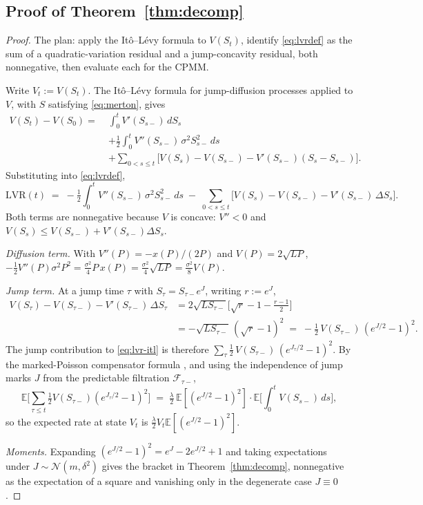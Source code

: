 \documentclass[runningheads]{llncs}
\newcommand{\E}{\mathbb{E}}
\newcommand{\1}{\mathbf{1}}
\begin{document}
\subsection{Proof of Theorem~\ref{thm:decomp}}\label{app:decomp}

\begin{proof}
The plan: apply the It\^o--L\'evy formula to $V(S_t)$, identify \eqref{eq:lvrdef} as the sum of a quadratic-variation residual and a jump-concavity residual, both nonnegative, then evaluate each for the CPMM.

Write $V_t := V(S_t)$. The It\^o--L\'evy formula for jump-diffusion processes \cite[Prop.~8.14]{cont2003financial} applied to $V$, with $S$ satisfying \eqref{eq:merton}, gives
\begin{align*}
V(S_t) - V(S_0) =\;& \int_0^t V'(S_{s-})\,dS_s \\
&+ \tfrac{1}{2}\int_0^t V''(S_{s-})\,\sigma^2 S_{s-}^2 \,ds \\
&+ \sum_{0 < s \leq t} \!\Big[V(S_s) - V(S_{s-}) - V'(S_{s-})(S_s - S_{s-})\Big].
\end{align*}
Substituting into \eqref{eq:lvrdef},
\begin{equation}\label{eq:lvr-itl}
\mathrm{LVR}(t) \;=\; -\tfrac{1}{2}\int_0^t V''(S_{s-})\,\sigma^2 S_{s-}^2 \, ds \;-\; \sum_{0 < s \leq t}\!\Big[V(S_s) - V(S_{s-}) - V'(S_{s-})\,\Delta S_s\Big].
\end{equation}
Both terms are nonnegative because $V$ is concave: $V''<0$ and $V(S_s) \leq V(S_{s-}) + V'(S_{s-})\Delta S_s$.

\emph{Diffusion term.} With $V''(P) = -x(P)/(2P)$ and $V(P) = 2\sqrt{LP}$, $-\tfrac{1}{2} V''(P) \sigma^2 P^2 = \tfrac{\sigma^2}{4} P\,x(P) = \tfrac{\sigma^2}{4} \sqrt{L P} = \tfrac{\sigma^2}{8} V(P)$.

\emph{Jump term.} At a jump time $\tau$ with $S_\tau = S_{\tau-} e^{J}$, writing $r := e^J$,
\begin{align*}
V(S_\tau) - V(S_{\tau-}) - V'(S_{\tau-})\,\Delta S_\tau
&= 2\sqrt{L S_{\tau-}}\Big[\sqrt{r} - 1 - \tfrac{r-1}{2}\Big] \\
&= -\sqrt{L S_{\tau-}}\,(\sqrt{r}-1)^2 \;=\; -\tfrac{1}{2}\,V(S_{\tau-})\,(e^{J/2} - 1)^2.
\end{align*}
The jump contribution to \eqref{eq:lvr-itl} is therefore $\sum_{\tau} \tfrac{1}{2}\,V(S_{\tau-})\,(e^{J_\tau/2} - 1)^2$. By the marked-Poisson compensator formula \cite[Prop.~8.8]{cont2003financial}, and using the independence of jump marks $J$ from the predictable filtration $\mathcal{F}_{\tau-}$,
\[
\E\!\Big[\sum_{\tau \leq t} \tfrac{1}{2}V(S_{\tau-})(e^{J_\tau/2}-1)^2\Big] \;=\; \tfrac{\lambda}{2}\,\E[(e^{J/2}-1)^2]\cdot\E\!\Big[\int_0^t V(S_{s-})\,ds\Big],
\]
so the expected rate at state $V_t$ is $\tfrac{\lambda}{2} V_t \E[(e^{J/2}-1)^2]$.

\emph{Moments.} Expanding $(e^{J/2}-1)^2 = e^{J} - 2 e^{J/2} + 1$ and taking expectations under $J \sim \mathcal{N}(m,\delta^2)$ gives the bracket in Theorem~\ref{thm:decomp}, nonnegative as the expectation of a square and vanishing only in the degenerate case $J\equiv 0$.
\end{proof}
\end{document}
